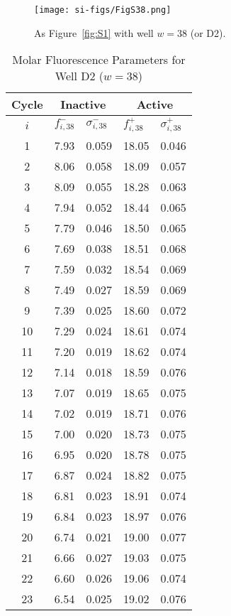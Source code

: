                 \begin{figure}
                    \centering
                    \texttt{[image: si-figs/FigS38.png]}
                    \caption{
                        As Figure~\ref{fig:S1} with well $w=38$ (or D2).
                    }
                \end{figure}
                \clearpage
    \begin{table}
        \caption{Molar Fluorescence Parameters for Well D2 ($w=38$)}
        \centering
        \begin{tabular}{c|ll|ll}
            Cycle & \multicolumn{2}{c|}{Inactive} & \multicolumn{2}{c}{Active} \\
            \hline
            $i$ & $f_{i,38}^{-}$ & $\sigma_{i,38}^{-}$ &  $f_{i,38}^{+}$ & $\sigma_{i,38}^{+}$ \\
            \hline
    1 & 7.93 & 0.059 & 18.05 & 0.046 \\
2 & 8.06 & 0.058 & 18.09 & 0.057 \\
3 & 8.09 & 0.055 & 18.28 & 0.063 \\
4 & 7.94 & 0.052 & 18.44 & 0.065 \\
5 & 7.79 & 0.046 & 18.50 & 0.065 \\
6 & 7.69 & 0.038 & 18.51 & 0.068 \\
7 & 7.59 & 0.032 & 18.54 & 0.069 \\
8 & 7.49 & 0.027 & 18.59 & 0.069 \\
9 & 7.39 & 0.025 & 18.60 & 0.072 \\
10 & 7.29 & 0.024 & 18.61 & 0.074 \\
11 & 7.20 & 0.019 & 18.62 & 0.074 \\
12 & 7.14 & 0.018 & 18.59 & 0.076 \\
13 & 7.07 & 0.019 & 18.65 & 0.075 \\
14 & 7.02 & 0.019 & 18.71 & 0.076 \\
15 & 7.00 & 0.020 & 18.73 & 0.075 \\
16 & 6.95 & 0.020 & 18.78 & 0.075 \\
17 & 6.87 & 0.024 & 18.82 & 0.075 \\
18 & 6.81 & 0.023 & 18.91 & 0.074 \\
19 & 6.84 & 0.023 & 18.97 & 0.076 \\
20 & 6.74 & 0.021 & 19.00 & 0.077 \\
21 & 6.66 & 0.027 & 19.03 & 0.075 \\
22 & 6.60 & 0.026 & 19.06 & 0.074 \\
23 & 6.54 & 0.025 & 19.02 & 0.076 \\

\end{tabular}
\end{table}
